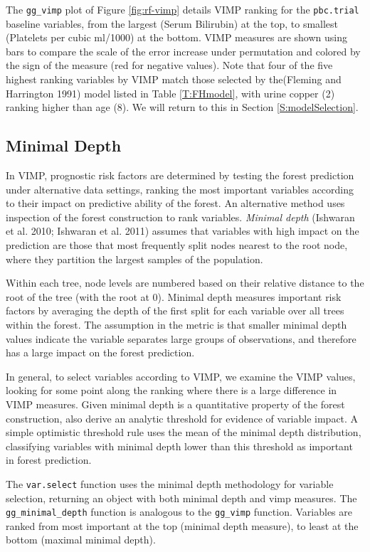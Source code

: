 \documentclass[article]{jss}
\begin{document}
The \texttt{gg\_vimp} plot of Figure \ref{fig:rf-vimp} details VIMP
ranking for the \texttt{pbc.trial} baseline variables, from the largest
(Serum Bilirubin) at the top, to smallest (Platelets per cubic ml/1000)
at the bottom. VIMP measures are shown using bars to compare the scale
of the error increase under permutation and colored by the sign of the
measure (red for negative values). Note that four of the five highest
ranking variables by VIMP match those selected by the(Fleming and
Harrington 1991) model listed in Table \ref{T:FHmodel}, with urine
copper (2) ranking higher than age (8). We will return to this in
Section \ref{S:modelSelection}.

\subsection{Minimal Depth}\label{minimal-depth}

In VIMP, prognostic risk factors are determined by testing the forest
prediction under alternative data settings, ranking the most important
variables according to their impact on predictive ability of the forest.
An alternative method uses inspection of the forest construction to rank
variables. \emph{Minimal depth} (Ishwaran et al. 2010; Ishwaran et al.
2011) assumes that variables with high impact on the prediction are
those that most frequently split nodes nearest to the root node, where
they partition the largest samples of the population.

Within each tree, node levels are numbered based on their relative
distance to the root of the tree (with the root at 0). Minimal depth
measures important risk factors by averaging the depth of the first
split for each variable over all trees within the forest. The assumption
in the metric is that smaller minimal depth values indicate the variable
separates large groups of observations, and therefore has a large impact
on the forest prediction.

In general, to select variables according to VIMP, we examine the VIMP
values, looking for some point along the ranking where there is a large
difference in VIMP measures. Given minimal depth is a quantitative
property of the forest construction, \cite{Ishwaran:2010} also derive an
analytic threshold for evidence of variable impact. A simple optimistic
threshold rule uses the mean of the minimal depth distribution,
classifying variables with minimal depth lower than this threshold as
important in forest prediction.

The  \texttt{var.select} function uses the minimal
depth methodology for variable selection, returning an object with both
minimal depth and vimp measures. The 
\texttt{gg\_minimal\_depth} function is analogous to the
\texttt{gg\_vimp} function. Variables are ranked from most important at
the top (minimal depth measure), to least at the bottom (maximal minimal
depth).
\end{document}
